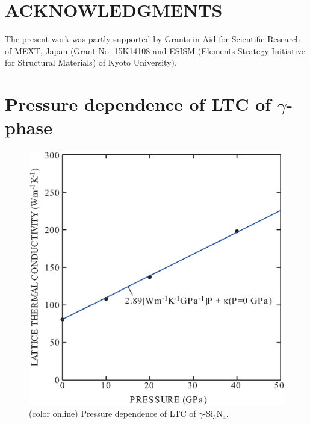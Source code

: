 \documentclass[twocolumn,amsmath,amssymb,a4paper,prb,superscriptaddress,floatfix]{revtex4-1}
\begin{document}
%
%
\section*{ACKNOWLEDGMENTS}
The present work was partly supported by Grants-in-Aid for Scientific
Research of MEXT, Japan (Grant No. 15K14108 and ESISM (Elements Strategy
Initiative for Structural Materials) of Kyoto University).

\appendix
\section{Pressure dependence of LTC of $\gamma$-phase}
\begin{figure}[ht]
 \begin{center}
  \includegraphics[width=0.80\linewidth]{S1.eps} \caption{(color online)
  Pressure dependence of LTC of $\gamma$-Si$_3$N$_4$.  \label{fig:S1} }
 \end{center}
\end{figure}



\end{document}
